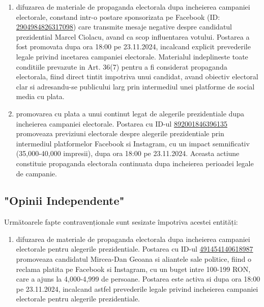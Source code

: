 \documentclass[a4paper,12pt]{article}
\begin{document}
\begin{enumerate}[leftmargin=*, label=\arabic*.)]
    \item difuzarea de materiale de propaganda electorala dupa incheierea campaniei electorale, constand intr-o postare sponsorizata pe Facebook (ID: \href{https://www.facebook.com/ads/library/?id=2904984826317098}{2904984826317098}) care transmite mesaje negative despre candidatul prezidential Marcel Ciolacu, avand ca scop influentarea votului. Postarea a fost promovata dupa ora 18:00 pe 23.11.2024, incalcand explicit prevederile legale privind incetarea campaniei electorale. Materialul indeplineste toate conditiile prevazute in Art. 36(7) pentru a fi considerat propaganda electorala, fiind direct tintit impotriva unui candidat, avand obiectiv electoral clar si adresandu-se publicului larg prin intermediul unei platforme de social media cu plata.
    \item promovarea cu plata a unui continut legat de alegerile prezidentiale dupa incheierea campaniei electorale. Postarea cu ID-ul \href{https://www.facebook.com/ads/library/?id=892001846396135}{892001846396135} promoveaza previziuni electorale despre alegerile prezidentiale prin intermediul platformelor Facebook si Instagram, cu un impact semnificativ (35,000-40,000 impresii), dupa ora 18:00 pe 23.11.2024. Aceasta actiune constituie propaganda electorala continuata dupa incheierea perioadei legale de campanie.
\end{enumerate}

\vspace{0.5cm}

\subsection{"Opinii Independente"}
Următoarele fapte contravenționale sunt sesizate împotriva acestei entități:

\begin{enumerate}[leftmargin=*, label=\arabic*.)]
    \item difuzarea de materiale de propaganda electorala dupa incheierea campaniei electorale pentru alegerile prezidentiale. Postarea cu ID-ul \href{https://www.facebook.com/ads/library/?id=491454140618987}{491454140618987} promoveaza candidatul Mircea-Dan Geoana si aliantele sale politice, fiind o reclama platita pe Facebook si Instagram, cu un buget intre 100-199 RON, care a ajuns la 4,000-4,999 de persoane. Postarea este activa si dupa ora 18:00 pe 23.11.2024, incalcand astfel prevederile legale privind incheierea campaniei electorale pentru alegerile prezidentiale.
\end{enumerate}
\end{document}
